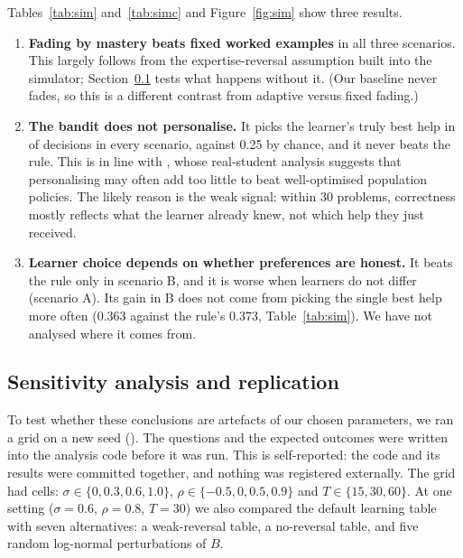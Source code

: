 \documentclass[11pt,a4paper]{article}
\begin{document}
Tables~\ref{tab:sim} and~\ref{tab:simc} and Figure~\ref{fig:sim} show three results.
\begin{enumerate}
  \item \textbf{Fading by mastery beats fixed worked examples} in all three scenarios.
        This largely follows from the expertise-reversal assumption built into the
        simulator; Section~\ref{sec:sens} tests what happens without it. (Our baseline
        never fades, so this is a different contrast from adaptive versus fixed fading.)
  \item \textbf{The bandit does not personalise.} It picks the learner's truly best help in
        \numBanditBestLo{} of decisions in every scenario, against 0.25 by chance, and it
        never beats the rule. This is in line with \citet{schmucker2025learning}, whose
        real-student analysis suggests that personalising may often add too little to beat
        well-optimised population policies. The likely reason is the weak signal: within 30 problems,
        correctness mostly reflects what the learner already knew, not which help they just
        received.
  \item \textbf{Learner choice depends on whether preferences are honest.} It beats the
        rule only in scenario B, and it is worse when learners do not differ (scenario A).
        Its gain in B does not come from picking the single best help more often (0.363
        against the rule's 0.373, Table~\ref{tab:sim}). We have not analysed where it
        comes from.
\end{enumerate}

\subsection{Sensitivity analysis and replication}
\label{sec:sens}
To test whether these conclusions are artefacts of our chosen parameters, we ran a grid
on a new seed (\numSensSeed). The questions and the expected outcomes were written into the
analysis code before it was run. This is self-reported: the code and its results were
committed together, and nothing was registered externally. The grid had \numSensCells{} cells:
$\sigma \in \{0, 0.3, 0.6, 1.0\}$, $\rho \in \{-0.5, 0, 0.5, 0.9\}$ and
$T \in \{15, 30, 60\}$. At one setting ($\sigma = 0.6$, $\rho = 0.8$, $T = 30$) we also
compared the default learning table with seven alternatives: a weak-reversal table, a
no-reversal table, and five random log-normal perturbations of $B$.
\end{document}
